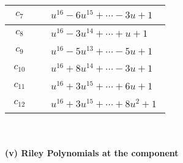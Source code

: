 \documentclass[1p]{elsarticle_modified}
\theoremstyle{definition}
\begin{document}
\begin{tabular}{m{50pt}|m{274pt}}
\hline $$\begin{aligned}c_{7}\end{aligned}$$&$\begin{aligned}
&u^{16}-6 u^{15}+\cdots-3 u+1
\end{aligned}$\\
\hline $$\begin{aligned}c_{8}\end{aligned}$$&$\begin{aligned}
&u^{16}-3 u^{14}+\cdots+u+1
\end{aligned}$\\
\hline $$\begin{aligned}c_{9}\end{aligned}$$&$\begin{aligned}
&u^{16}-5 u^{13}+\cdots-5 u+1
\end{aligned}$\\
\hline $$\begin{aligned}c_{10}\end{aligned}$$&$\begin{aligned}
&u^{16}+8 u^{14}+\cdots-3 u+1
\end{aligned}$\\
\hline $$\begin{aligned}c_{11}\end{aligned}$$&$\begin{aligned}
&u^{16}+3 u^{15}+\cdots+6 u+1
\end{aligned}$\\
\hline $$\begin{aligned}c_{12}\end{aligned}$$&$\begin{aligned}
&u^{16}+3 u^{15}+\cdots+8 u^2+1
\end{aligned}$\\
\hline
\end{tabular}\\~\\
\newpage\renewcommand{\arraystretch}{1}
\flushleft \textbf{(v) Riley Polynomials at the component}\newline \\
\end{document}
